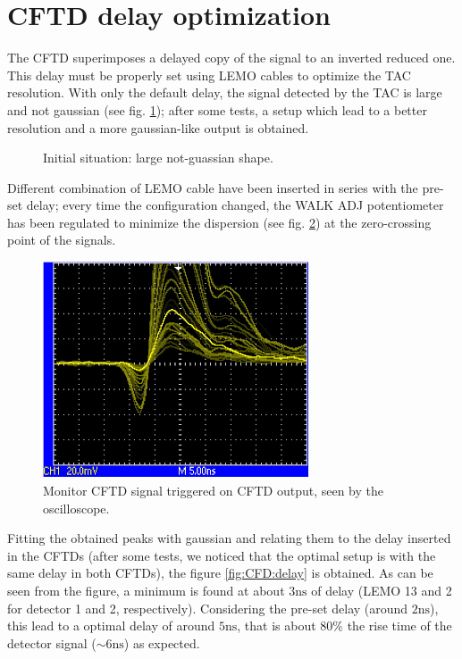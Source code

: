 \documentclass[11pt,a4 paper]{article}
\begin{document}
\section{CFTD delay optimization}

The CFTD superimposes a delayed copy of the signal to an inverted reduced one. This delay must be properly set using LEMO cables to optimize the TAC resolution. With only the default delay, the signal detected by the TAC is large and not gaussian (see fig. \ref{fig:delay:bad}); after some tests, a setup which lead to a better resolution and a more gaussian-like output is obtained.

\begin{figure}[H]
    \centering
    \caption{Initial situation: large not-guassian shape.}
    \label{fig:delay:bad}
\end{figure}

Different combination of LEMO cable have been inserted in series with the pre-set delay; every time the configuration changed, the WALK ADJ potentiometer has been regulated to minimize the dispersion (see fig. \ref{fig:oscilloscope}) at the zero-crossing point of the signals.

\begin{figure}[H]
    \centering
    \includegraphics[width=0.7\textwidth]{img/oscilloscope.jpg}
    \caption{Monitor CFTD signal triggered on CFTD output, seen by the oscilloscope.}
    \label{fig:oscilloscope}
\end{figure}

Fitting the obtained peaks with gaussian and relating them to the delay inserted in the CFTDs (after some tests, we noticed that the optimal setup is with the same delay in both CFTDs), the figure \ref{fig:CFD:delay} is obtained. As can be seen from the figure, a minimum is found at about $3\si{\nano\second}$ of delay (LEMO 13 and 2 for detector 1 and 2, respectively). Considering the pre-set delay (around $2\si{\nano\second}$), this lead to a optimal delay of around $5\si{\nano\second}$, that is about $80\%$ the rise time of the detector signal ($\sim6\si{\nano\second}$) as expected.
\end{document}

